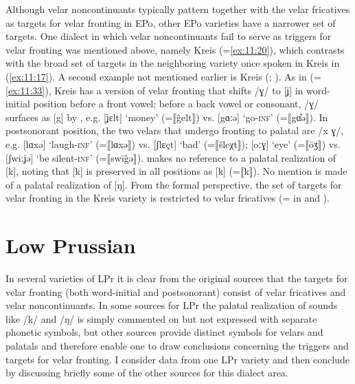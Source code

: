 Although velar noncontinuants typically pattern together with the velar fricatives as targets for velar fronting in EPo, other EPo varieties have a narrower set of targets. One dialect in which velar noncontinuants fail to serve as triggers for velar fronting was mentioned above, namely Kreis  (=\ref{ex:11:20}), which contrasts with the broad set of targets in the neighboring variety once spoken in Kreis  in (\ref{ex:11:17}). A second example not mentioned earlier is Kreis  (\citealt{Mahnke1931}; ). As in  (=\ref{ex:11:33}), Kreis  has a version of velar fronting that shifts /ɣ/ to [ʝ] in word-initial position before a front vowel; before a back vowel or consonant, /ɣ/ surfaces as [g] by , e.g. [ʝɛlt] ‘money’ (=⟦\^{g}elt⟧) vs. [gɑːǝ] ‘go-\textsc{inf}’ (=⟦gɑ̊ǝ⟧). In postsonorant position, the two velars that undergo fronting to palatal are /x ɣ/, e.g. [lɑxǝ] ‘laugh-\textsc{inf}’ (=⟦lɑxǝ⟧) vs. [ʃlɛçt] ‘bad’ (=⟦šleχt⟧); [oːɣ] ‘eye’ (=⟦ōʒ⟧) vs. [ʃwiːʝǝ] ‘be silent-\textsc{inf}’ (=⟦swī\^{g}ǝ⟧). \citet[35]{Mahnke1931} makes no reference to a palatal realization of [k], noting that  [k] is preserved in all positions as [k] (=⟦k⟧). No mention is made of a palatal realization of [ŋ]. From the formal perspective, the set of targets for velar fronting in the Kreis  variety is restricted to velar fricatives (= in  and ).

\section{{Low} {Prussian}}\label{sec:11.6}

In several varieties of LPr it is clear from the original sources that the targets for velar fronting (both word-initial and postsonorant) consist of velar fricatives and velar noncontinuants. In some sources for LPr the palatal realization of sounds like /k/ and /ŋ/ is simply commented on but not expressed with separate phonetic symbols, but other sources provide distinct symbols for velars and palatals and therefore enable one to draw conclusions concerning the triggers and targets for velar fronting. I consider data from one LPr variety and then conclude by discussing briefly some of the other sources for this dialect area.

